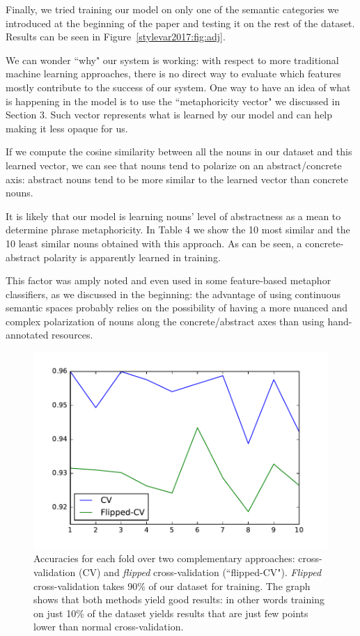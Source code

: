 Finally, we tried training our model on only one of the semantic categories we introduced at the beginning of the paper and testing it on the rest of the dataset. Results can be seen in Figure~\ref{stylevar2017:fig:adj}. 

We can wonder ``why" our system is working: with respect to more traditional machine learning approaches, there is no direct way to evaluate which features mostly contribute to the success of our system. One way to have an idea of what is happening in the model is to use the ``metaphoricity vector" we discussed in Section 3.
Such vector  represents what is learned by our model and can help making it less opaque for us.

If we compute the cosine similarity between all the nouns in our dataset and this learned vector, we can see that nouns tend to polarize on an abstract/concrete axis: abstract nouns tend to be more similar to the learned vector than concrete nouns. 

It is likely that our model is learning nouns' level of abstractness as a mean to determine phrase metaphoricity. In Table 4 we show the 10 most similar and the 10 least similar nouns obtained with this approach.  As can be seen, a concrete-abstract polarity is apparently learned in training.

This factor was amply noted  and even used in some feature-based metaphor classifiers, as we discussed in the beginning: the advantage of using continuous semantic spaces probably relies on the  possibility of having a more nuanced and complex polarization of nouns along the concrete/abstract axes than using hand-annotated resources.



\begin{figure}[h]
	\centering
	\includegraphics[width=0.75\linewidth]{studies/stylevar2017/accuracy.pdf}
	\caption{\label{stylevar2017:fig:cv}Accuracies for each fold over two complementary approaches: cross-validation (CV) and \textit{flipped} cross-validation (``flipped-CV"). \textit{Flipped} cross-validation takes 90\% of our dataset for training. The graph shows that both methods yield good results: in other words training on just 10\% of the dataset yields results that are just few points lower than normal cross-validation.}
\end{figure}

